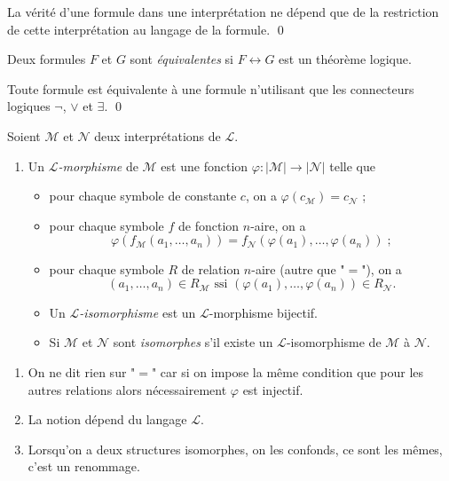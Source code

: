 \documentclass[./main]{subfiles}
\begin{document}
  \begin{crlr}
    La vérité d'une formule dans une interprétation ne dépend que de la restriction de cette interprétation au langage de la formule.
    \qed
  \end{crlr}

  \begin{defn}
    Deux formules $F$ et $G$ sont \textit{équivalentes} si $F \leftrightarrow G$ est un théorème logique.
  \end{defn}

  \begin{prop}
    Toute formule est équivalente à une formule n'utilisant que les connecteurs logiques $\lnot$, $\lor$ et $\exists$.
    \qed
  \end{prop}


  \begin{defn}
    Soient $\mathcal{M}$ et $\mathcal{N}$ deux interprétations de $\mathcal{L}$.
    \begin{enumerate}
      \item Un \textit{$\mathcal{L}$-morphisme} de $\mathcal{M}$ est une fonction $\varphi : |\mathcal{M}| \to |\mathcal{N}|$ telle que 
        \begin{itemize}
          \item pour chaque symbole de constante $c$, on a $\varphi(c_{\mathcal{M}}) = c_{\mathcal{N}}$ ;
          \item pour chaque symbole $f$ de fonction $n$-aire, on a 
            \[
            \varphi(f_{\mathcal{M}}(a_1, \ldots, a_n)) = f_{\mathcal{N}}(\varphi(a_1), \ldots, \varphi(a_n))\;
            ;\] 
          \item pour chaque symbole $R$ de relation $n$-aire (autre que "$=$"), on a 
            \[
              (a_1, \ldots, a_n) \in R_{\mathcal{M}} \text{ ssi } (\varphi(a_1), \ldots, \varphi(a_n)) \in R_{\mathcal{N}}
            .\]
          \item Un \textit{$\mathcal{L}$-isomorphisme} est un $\mathcal{L}$-morphisme bijectif.
          \item Si $\mathcal{M}$ et $\mathcal{N}$ sont \textit{isomorphes} s'il existe un $\mathcal{L}$-isomorphisme de $\mathcal{M}$ à $\mathcal{N}$.
        \end{itemize}
    \end{enumerate}
  \end{defn}

  \begin{rmk}
    \begin{enumerate}
      \item On ne dit rien sur "$=$" car si on impose la même condition que pour les autres relations alors nécessairement $\varphi$ est injectif.
      \item La notion dépend du langage $\mathcal{L}$.
      \item Lorsqu'on a deux structures isomorphes, on les confonds, ce sont les mêmes, c'est un renommage.
    \end{enumerate}
  \end{rmk}
\end{document}
